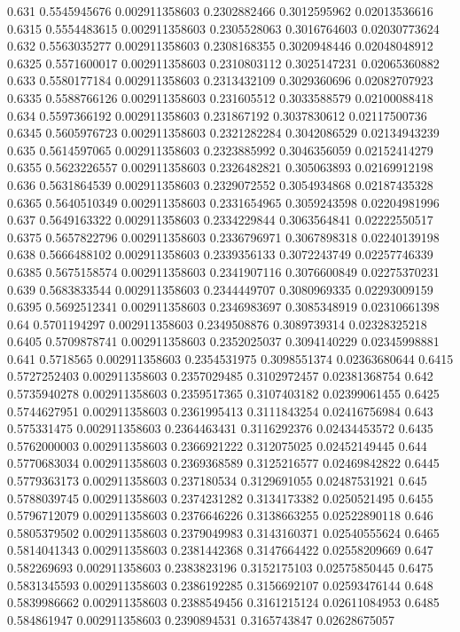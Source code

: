 {0.631 0.5545945676 0.002911358603 0.2302882466 0.3012595962 0.02013536616
0.6315 0.5554483615 0.002911358603 0.2305528063 0.3016764603 0.02030773624
0.632 0.5563035277 0.002911358603 0.2308168355 0.3020948446 0.02048048912
0.6325 0.5571600017 0.002911358603 0.2310803112 0.3025147231 0.02065360882
0.633 0.5580177184 0.002911358603 0.2313432109 0.3029360696 0.02082707923
0.6335 0.5588766126 0.002911358603 0.231605512 0.3033588579 0.02100088418
0.634 0.5597366192 0.002911358603 0.231867192 0.3037830612 0.02117500736
0.6345 0.5605976723 0.002911358603 0.2321282284 0.3042086529 0.02134943239
0.635 0.5614597065 0.002911358603 0.2323885992 0.3046356059 0.02152414279
0.6355 0.5623226557 0.002911358603 0.2326482821 0.305063893 0.02169912198
0.636 0.5631864539 0.002911358603 0.2329072552 0.3054934868 0.02187435328
0.6365 0.5640510349 0.002911358603 0.2331654965 0.3059243598 0.02204981996
0.637 0.5649163322 0.002911358603 0.2334229844 0.3063564841 0.02222550517
0.6375 0.5657822796 0.002911358603 0.2336796971 0.3067898318 0.02240139198
0.638 0.5666488102 0.002911358603 0.2339356133 0.3072243749 0.02257746339
0.6385 0.5675158574 0.002911358603 0.2341907116 0.3076600849 0.02275370231
0.639 0.5683833544 0.002911358603 0.2344449707 0.3080969335 0.02293009159
0.6395 0.5692512341 0.002911358603 0.2346983697 0.3085348919 0.02310661398
0.64 0.5701194297 0.002911358603 0.2349508876 0.3089739314 0.02328325218
0.6405 0.5709878741 0.002911358603 0.2352025037 0.3094140229 0.02345998881
0.641 0.5718565 0.002911358603 0.2354531975 0.3098551374 0.02363680644
0.6415 0.5727252403 0.002911358603 0.2357029485 0.3102972457 0.02381368754
0.642 0.5735940278 0.002911358603 0.2359517365 0.3107403182 0.02399061455
0.6425 0.5744627951 0.002911358603 0.2361995413 0.3111843254 0.02416756984
0.643 0.575331475 0.002911358603 0.2364463431 0.3116292376 0.02434453572
0.6435 0.5762000003 0.002911358603 0.2366921222 0.312075025 0.02452149445
0.644 0.5770683034 0.002911358603 0.2369368589 0.3125216577 0.02469842822
0.6445 0.5779363173 0.002911358603 0.237180534 0.3129691055 0.02487531921
0.645 0.5788039745 0.002911358603 0.2374231282 0.3134173382 0.0250521495
0.6455 0.5796712079 0.002911358603 0.2376646226 0.3138663255 0.02522890118
0.646 0.5805379502 0.002911358603 0.2379049983 0.3143160371 0.02540555624
0.6465 0.5814041343 0.002911358603 0.2381442368 0.3147664422 0.02558209669
0.647 0.582269693 0.002911358603 0.2383823196 0.3152175103 0.02575850445
0.6475 0.5831345593 0.002911358603 0.2386192285 0.3156692107 0.02593476144
0.648 0.5839986662 0.002911358603 0.2388549456 0.3161215124 0.02611084953
0.6485 0.584861947 0.002911358603 0.2390894531 0.3165743847 0.02628675057
}
